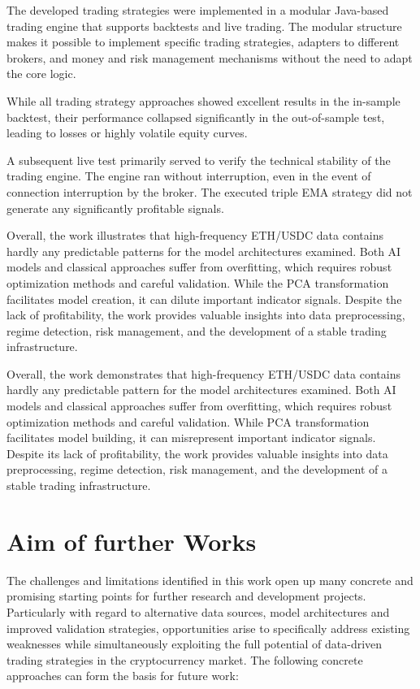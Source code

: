 The developed trading strategies were implemented in a modular Java-based trading engine that supports backtests and live trading.
The modular structure makes it possible to implement specific trading strategies, adapters to different brokers, and money and risk management mechanisms without the need to adapt the core logic.

While all trading strategy approaches showed excellent results in the in-sample backtest, their performance collapsed significantly in the out-of-sample test, leading to losses or highly volatile equity curves.

A subsequent live test primarily served to verify the technical stability of the trading engine.
The engine ran without interruption, even in the event of connection interruption by the broker.
The executed triple EMA strategy did not generate any significantly profitable signals.

Overall, the work illustrates that high-frequency ETH/USDC data contains hardly any predictable patterns for the model architectures examined.
Both AI models and classical approaches suffer from overfitting, which requires robust optimization methods and careful validation.
While the PCA transformation facilitates model creation, it can dilute important indicator signals.
Despite the lack of profitability, the work provides valuable insights into data preprocessing, regime detection, risk management, and the development of a stable trading infrastructure.

Overall, the work demonstrates that high-frequency ETH/USDC data contains hardly any predictable pattern for the model architectures examined.
Both AI models and classical approaches suffer from overfitting, which requires robust optimization methods and careful validation.
While PCA transformation facilitates model building, it can misrepresent important indicator signals.
Despite its lack of profitability, the work provides valuable insights into data preprocessing, regime detection, risk management, and the development of a stable trading infrastructure.

\section{Aim of further Works}
\label{chap:aim-further-works}

The challenges and limitations identified in this work open up many concrete and promising starting points for further research and development projects.
Particularly with regard to alternative data sources, model architectures and improved validation strategies, opportunities arise to specifically address existing weaknesses while simultaneously exploiting the full potential of data-driven trading strategies in the cryptocurrency market.
The following concrete approaches can form the basis for future work:

